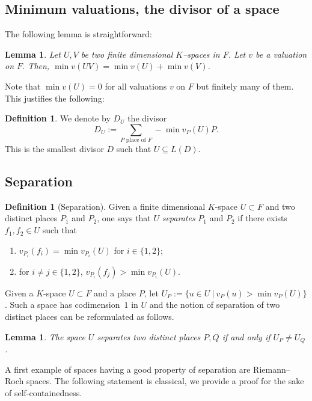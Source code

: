 \documentclass[10pt]{amsart}
\newtheorem{lemm}[theo]{Lemma}
\theoremstyle{definition}
\newtheorem{defi}[theo]{Definition}
\theoremstyle{remark}
\begin{document}
\subsection{Minimum valuations, the divisor of a space}\label{sec:divisor}

The following lemma is straightforward:

\begin{lemm}\label{lem:sum_min_val}
Let $U,V$ be two finite dimensional $K$--spaces in $F$. Let $v$ be a valuation on $F$. Then, $\min v(UV)=\min v(U)+ \min v(V)$.
\end{lemm}

Note that $\min v(U)=0$ for all valuations $v$ on $F$ but finitely many of them. This justifies the following:

\begin{defi}\label{def:DU}
We denote by $D_U$ the divisor
\[
D_U:=\sum_{P\textrm{ place of }F} -\min v_P(U)P.
\]
This is the smallest divisor $D$ such that $U \subseteq L(D)$.
\end{defi}


\subsection{Separation}\label{sec:separation}

\begin{defi}[Separation]
Given a finite dimensional $K$-space $U \subset F$ and two distinct places $P_1$ and $P_2$, one says that $U$ \emph{separates} $P_1$ and $P_2$ if there exists $f_1, f_2 \in U$ such that
\begin{enumerate}
\item $v_{P_i} (f_i)=\min v_{P_i}(U)$ for $i \in \{1,2\}$;
\item for $i \neq j \in \{1,2\}$, $v_{P_i}(f_j) > \min v_{P_i}(U)$.
\end{enumerate}
\end{defi}

Given a $K$-space $U \subset F$ and a place $P$, let $U_P:=\{ u \in U~|~v_P(u) > \min v_P(U)\}$. Such a space has codimension~$1$ in $U$ and the notion of separation of two distinct places can be reformulated as follows.

\begin{lemm}\label{lem:U_pU_Q}
The space $U$ separates two distinct places $P, Q$ if and only if $U_P \neq U_Q$.
\end{lemm}

A first example of spaces having a good property of separation are Riemann--Roch spaces. The following statement is classical, we provide a proof for the sake of self-containedness.
\end{document}
